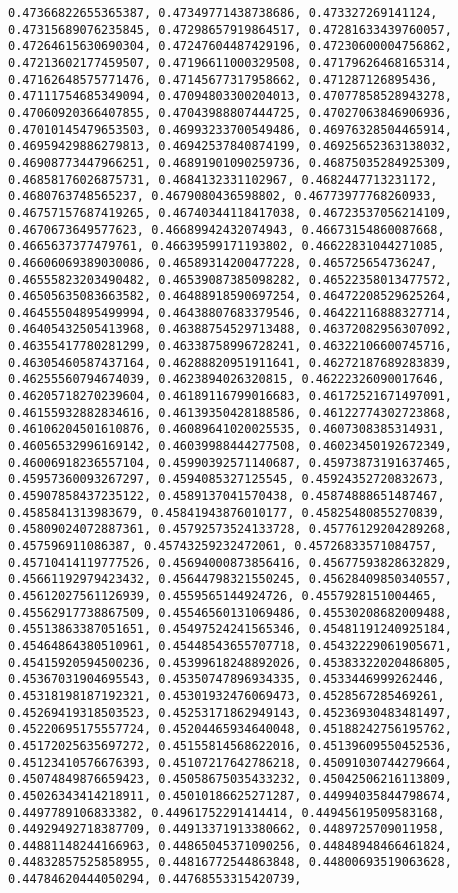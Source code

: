 \documentclass[11pt]{article}
\begin{document}
\begin{Verbatim}[commandchars=\\\{\}]
0.47366822655365387, 0.47349771438738686, 0.473327269141124, 0.47315689076235845, 0.47298657919864517, 0.47281633439760057, 0.47264615630690304, 0.47247604487429196, 0.47230600004756862, 0.47213602177459507, 0.47196611000329508, 0.47179626468165314, 0.47162648575771476, 0.47145677317958662, 0.471287126895436, 0.47111754685349094, 0.47094803300204013, 0.47077858528943278, 0.47060920366407855, 0.47043988807444725, 0.47027063846906936, 0.47010145479653503, 0.46993233700549486, 0.46976328504465914, 0.46959429886279813, 0.46942537840874199, 0.46925652363138032, 0.46908773447966251, 0.46891901090259736, 0.46875035284925309, 0.46858176026875731, 0.4684132331102967, 0.4682447713231172, 0.4680763748565237, 0.4679080436598802, 0.46773977768260933, 0.46757157687419265, 0.46740344118417038, 0.46723537056214109, 0.4670673649577623, 0.46689942432074943, 0.46673154860087668, 0.4665637377479761, 0.46639599171193802, 0.46622831044271085, 0.46606069389030086, 0.46589314200477228, 0.465725654736247, 0.46555823203490482, 0.46539087385098282, 0.46522358013477572, 0.46505635083663582, 0.46488918590697254, 0.46472208529625264, 0.46455504895499994, 0.46438807683379546, 0.46422116888327714, 0.46405432505413968, 0.46388754529713488, 0.46372082956307092, 0.46355417780281299, 0.46338758996728241, 0.46322106600745716, 0.46305460587437164, 0.46288820951911641, 0.46272187689283839, 0.46255560794674039, 0.4623894026320815, 0.46222326090017646, 0.46205718270239604, 0.46189116799016683, 0.46172521671497091, 0.46155932882834616, 0.46139350428188586, 0.46122774302723868, 0.46106204501610876, 0.46089641020025535, 0.4607308385314931, 0.46056532996169142, 0.46039988444277508, 0.46023450192672349, 0.46006918236557104, 0.45990392571140687, 0.45973873191637465, 0.45957360093267297, 0.4594085327125545, 0.45924352720832673, 0.45907858437235122, 0.4589137041570438, 0.45874888651487467, 0.4585841313983679, 0.45841943876010177, 0.45825480855270839, 0.45809024072887361, 0.45792573524133728, 0.45776129204289268, 0.457596911086387, 0.45743259232472061, 0.45726833571084757, 0.45710414119777526, 0.45694000873856416, 0.45677593828632829, 0.45661192979423432, 0.45644798321550245, 0.45628409850340557, 0.45612027561126939, 0.4559565144924726, 0.4557928151004465, 0.45562917738867509, 0.45546560131069486, 0.45530208682009488, 0.45513863387051651, 0.45497524241565346, 0.45481191240925184, 0.45464864380510961, 0.45448543655707718, 0.45432229061905671, 0.45415920594500236, 0.45399618248892026, 0.45383322020486805, 0.45367031904695543, 0.45350747896934335, 0.4533446999262446, 0.45318198187192321, 0.45301932476069473, 0.4528567285469261, 0.45269419318503523, 0.45253171862949143, 0.45236930483481497, 0.45220695175557724, 0.45204465934640048, 0.45188242756195762, 0.45172025635697272, 0.45155814568622016, 0.45139609550452536, 0.45123410576676393, 0.45107217642786218, 0.45091030744279664, 0.45074849876659423, 0.45058675035433232, 0.45042506216113809, 0.45026343414218911, 0.45010186625271287, 0.44994035844798674, 0.4497789106833382, 0.44961752291414414, 0.44945619509583168, 0.44929492718387709, 0.44913371913380662, 0.4489725709011958, 0.44881148244166963, 0.44865045371090256, 0.44848948466461824, 0.44832857525858955, 0.44816772544863848, 0.44800693519063628, 0.44784620444050294, 0.44768553315420739, 
\end{Verbatim}
\end{document}
